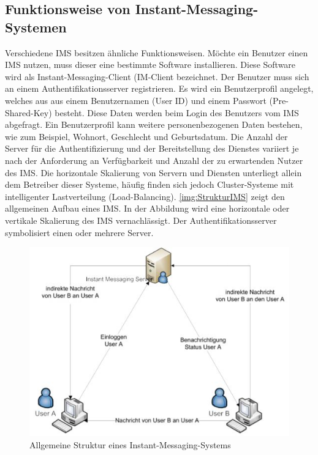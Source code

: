 \documentclass[a4paper,titlepage,halfparskip,12pt]{scrreprt}
\begin{document}
\begin{onehalfspacing}
\section{Funktionsweise von Instant-Messaging-Systemen}
\label{sec:IMSFunktion}

Verschiedene \ac{IMS} besitzen ähnliche Funktionsweisen. Möchte ein Benutzer einen \ac{IMS} nutzen, muss dieser eine bestimmte Software installieren. Diese Software wird als Instant-Messaging-Client (IM-Client bezeichnet. Der Benutzer muss sich an einem Authentifikationsserver registrieren. Es wird ein Benutzerprofil angelegt, welches aus aus einem Benutzernamen (User ID) und einem Passwort (Pre-Shared-Key) besteht. Diese Daten werden beim Login des Benutzers vom \ac{IMS} abgefragt. Ein Benutzerprofil kann weitere personenbezogenen Daten bestehen, wie zum Beispiel, Wohnort, Geschlecht und Geburtsdatum. Die Anzahl der Server für die Authentifizierung und der Bereitstellung des Dienstes variiert je nach der Anforderung an Verfügbarkeit und Anzahl der zu erwartenden Nutzer des \ac{IMS}. Die horizontale Skalierung von Servern und Diensten unterliegt allein dem Betreiber dieser Systeme, häufig finden sich jedoch Cluster-Systeme mit intelligenter Lastverteilung (Load-Balancing). \autoref{img:StrukturIMS} zeigt den allgemeinen Aufbau eines \ac{IMS}. In der Abbildung wird eine horizontale oder vertikale Skalierung des \ac{IMS} vernachlässigt. Der Authentifikationsserver symbolisiert einen oder mehrere Server.\cite{anastasiaIMS}

\begin{figure}[h]
	\centering
	\includegraphics{images/GrundlegendeStrukturIMS}
	\caption{Allgemeine Struktur eines Instant-Messaging-Systems \cite{anastasiaIMS}}
	\label{img:StrukturIMS}
\end{figure}


\end{onehalfspacing}
\end{document}
